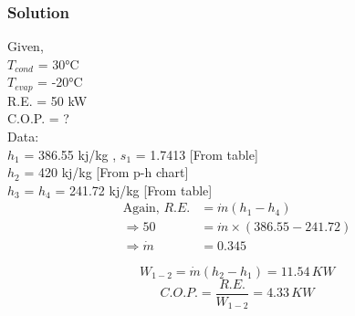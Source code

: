 \documentclass{article}
\begin{document}
\subsubsection*{Solution}
\begin{multicols}{2}
  Given,\\
  $T_{cond}$ = 30°C \\
  $T_{evap}$ = -20°C \\
  R.E. = 50 kW \\
  C.O.P. = ? \\
  Data:\\
  $h_1$ = 386.55 kj/kg , $s_1$ = 1.7413 [From table] \\
  $h_2$ = 420 kj/kg [From p-h chart] \\
  $h_3$ = $h_4$ = 241.72 kj/kg [From table] \\

  \begin{align*}
    \text{Again, } R.E. &= \dot{m} (h_1 - h_4) \\ 
    \Rightarrow 50 &= \dot{m} \times (386.55 - 241.72) \\
    \Rightarrow \dot{m} &= 0.345  
  \end{align*}

  $$W_{1-2} = \dot{m}(h_2-h_1) = 11.54 \, KW$$
  $$C.O.P. = \frac{R.E.}{W_{1-2}} = 4.33 \, KW$$

\end{multicols}
\end{document}
